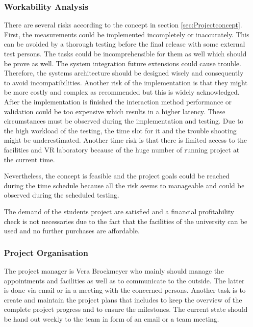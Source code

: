 \subsubsection{Workability Analysis}\label{sec:PMworkabilityAnalysis}
There are several risks according to the concept in section \ref{sec:Projectconcept}. First, the measurements could be implemented incompletely or inaccurately. This can be avoided by a thorough testing before the final release with some external test persons. The tasks could be incomprehensible for them as well which should be prove as well.
The system integration future extensions could cause trouble. Therefore, the systems architecture should be designed wisely and consequently to avoid incompatibilities. Another risk of the implementation is that they might be more costly and complex as recommended but this is widely acknowledged. After the implementation is finished the interaction method performance or validation could be too expensive which results in a higher latency. These circumstances must be observed during the implementation and testing. Due to the high workload of the testing, the time slot for it and the trouble shooting might be underestimated. Another time risk is that there is limited access to the facilities and VR laboratory because of the huge number of running project at the current time.

Nevertheless, the concept is feasible and the project goals could be reached during the time schedule because all the risk seems to manageable and could be observed during the scheduled testing.

The demand of the students project are satisfied and a financial profitability check is not necessaries due to the fact that the facilities of the university can be used and no further purchases are affordable.


\subsubsection{Project Organisation}\label{sec:PMProjectOrganisation}

The project manager is Vera Brockmeyer who mainly should manage the appointments and facilities as well as to communicate to the outside. The latter is done via email or in a meeting with the concerned persons. Another task is to create and maintain the project plans that includes to keep the overview of the complete project progress and to ensure the milestones.
The current state should be hand out weekly to the team in form of an email or a team meeting.


